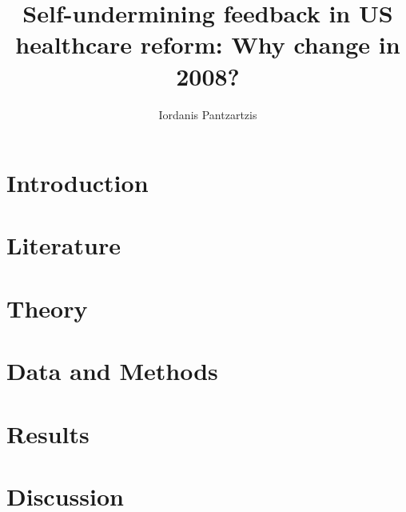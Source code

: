\documentclass[11pt, xcolor=dvipsnames]{article}
\author[1]{Iordanis Pantzartzis}
\affil[1]{Universität Konstanz, 01/1001158}
\title{Self-undermining feedback in US healthcare reform: Why change in 2008?}
\begin{document}


\restoregeometry

\maketitle

\section*{Introduction}

\nocite{Jacobs2014}
\section*{Literature}


\section*{Theory}


\section*{Data and Methods}


\section*{Results}


\section*{Discussion}


\newpage
\newpage
\thispagestyle{empty}
\begingroup
{}
\printbibliography
\endgroup
\end{document}
